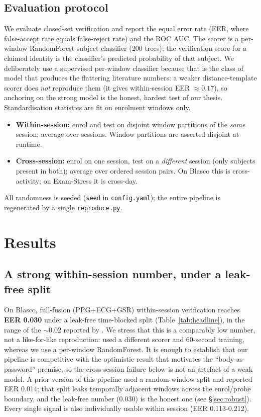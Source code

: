 \documentclass[11pt]{article}
\begin{document}
\subsection{Evaluation protocol}
We evaluate closed-set verification and report the equal error rate (EER, where false-accept
rate equals false-reject rate) and the ROC AUC. The scorer is a per-window RandomForest subject
classifier (200 trees); the verification score for a claimed identity is the classifier's
predicted probability of that subject. We deliberately use a supervised per-window classifier
because that is the class of model that produces the flattering literature numbers: a
weaker distance-template scorer does \emph{not} reproduce them (it gives within-session
EER ${\approx}0.17$), so anchoring on the strong model is the honest, hardest test of our
thesis. Standardisation statistics are fit on enrolment windows only.

\begin{itemize}
  \item \textbf{Within-session:} enrol and test on disjoint window partitions of the
  \emph{same} session; average over sessions. Window partitions are asserted disjoint at
  runtime.
  \item \textbf{Cross-session:} enrol on one session, test on a \emph{different} session
  (only subjects present in both); average over ordered session pairs. On Blasco this is
  cross-activity; on Exam-Stress it is cross-day.
\end{itemize}

All randomness is seeded (\texttt{seed} in \texttt{config.yaml}); the entire pipeline is
regenerated by a single \texttt{reproduce.py}.

\section{Results}
\label{sec:results}

\subsection{A strong within-session number, under a leak-free split}
\label{sec:within}
On Blasco, full-fusion (PPG+ECG+GSR) within-session verification reaches
\textbf{EER \num{0.030}} under a leak-free time-blocked split (Table~\ref{tab:headline}), in
the range of the ${\sim}0.02$ reported by \citet{blasco2018}. We stress that this is a
comparably low number, not a like-for-like reproduction: \citet{blasco2018} used a different
scorer and 60-second training, whereas we use a per-window RandomForest. It is enough to
establish that our pipeline is competitive with the optimistic result that motivates the
``body-as-password'' premise, so the cross-session failure below is not an artefact of a weak
model. A prior version of this pipeline used a random-window split and reported EER
\num{0.014}; that split leaks temporally adjacent windows across the enrol/probe boundary, and
the leak-free number (\num{0.030}) is the honest one (see \S\ref{sec:robust}). Every single
signal is also individually usable within session (EER \num{0.113}-\num{0.212}).
\end{document}
